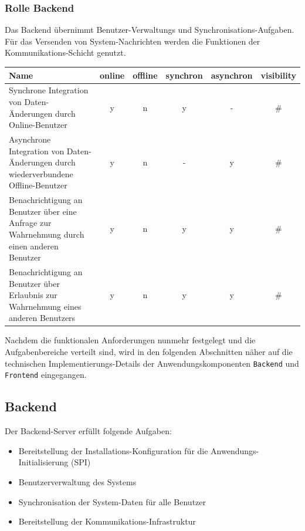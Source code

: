 \subsubsection{Rolle \textbf{Backend}}
Das Backend übernimmt Benutzer-Verwaltungs und Synchronisations-Aufgaben. Für das Versenden von System-Nachrichten werden die Funktionen der Kommunikations-Schicht genutzt.\\
	\begin{table}[H]
		\centering
		\begin{tabulary}{\columnwidth}{|L|C|C|C|C|C|}
		\hline
			\textbf{Name} & \textbf{online} & \textbf{offline} & \textbf{synchron} & \textbf{asynchron} & \textbf{visibility} \\ \hline
			Synchrone Integration von Daten-Änderungen durch Online-Benutzer & y & n & y & - & \# \\ \hline
			Asynchrone Integration von Daten-Änderungen durch wiederverbundene Offline-Benutzer & y & n & - & y & \# \\ \hline
			Benachrichtigung an Benutzer über eine Anfrage zur Wahrnehmung durch einen anderen Benutzer & y & n & y & y & \#  \\ \hline
			Benachrichtigung an Benutzer über Erlaubnis zur Wahrnehmung eines anderen Benutzers & y & n & y & y & \#  \\ \hline
		\end{tabulary}
	\end{table}
\vspace{2ex}
\noindent
Nachdem die funktionalen Anforderungen nunmehr festgelegt und die Aufgabenbereiche verteilt sind, wird in den folgenden Abschnitten näher auf die technischen Implementierungs-Details der Anwendungskomponenten \texttt{Backend} und \texttt{Frontend} eingegangen.

\subsection{Backend}\label{5_BE}
Der Backend-Server erfüllt folgende Aufgaben:
	\begin{itemize}
		\item Bereitstellung der Installations-Konfiguration für die Anwendungs-Initialisierung (SPI)
		\item Benutzerverwaltung des Systems
		\item Synchronisation der System-Daten für alle Benutzer
		\item Bereitstellung der Kommunikations-Infrastruktur
	\end{itemize}

